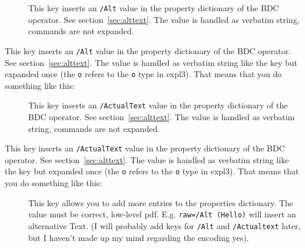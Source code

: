 \documentclass[DIV=12,parskip=half-,bibliography=totoc]{scrartcl}
\begin{document}
\begin{description}
  \item[] This key inserts an \texttt{/Alt} value in the property dictionary of the BDC operator. See section~\ref{sec:alttext}. The value is handled as verbatim string, commands are not expanded.

  \item[ This key inserts an \texttt{/Alt} value in the property dictionary of the BDC operator. See section~\ref{sec:alttext}. The value is handled as verbatim string like the key  but expanded once (the \texttt{o} refers to the \texttt{o} type in expl3). That means that you do something like this:

      \begin{lstlisting}
      \newcommand\myalttext{\frac{a}{b}}
      \tagmcbegin{tag=P,alttext-o=\myalttext}
      \end{lstlisting}

      and it will insert \verb+\frac{a}{b}+  (hex encoded) in the pdf.

  \item[\PrintKeyName{actualtext}] This key inserts an \texttt{/ActualText} value in the property dictionary of the BDC operator. See section~\ref{sec:alttext}. The value is handled as verbatim string, commands are not expanded.

  \item[ This key inserts an \texttt{/ActualText} value in the property dictionary of the BDC operator. See section~\ref{sec:alttext}. The value is handled as verbatim string like the key  but expanded once (the \texttt{o} refers to the \texttt{o} type in expl3). That means that you do something like this:

      \begin{lstlisting}
      \newcommand\myactualtext{X}
      \tagmcbegin{tag=P,alttext-o=\myactualtext}
      \end{lstlisting}

      and it will insert \verb+X+ (hex encoded)  in the pdf.

  \item[\PrintKeyName{raw}] This key allows you to add more entries to the properties dictionary. The value must be correct, low-level pdf. E.g. \verb+raw=/Alt (Hello)+ will insert an alternative Text. (I will probably add keys for \texttt{/Alt} and \texttt{/Actualtext} later, but I haven't made up my mind regarding the encoding yes).
\end{description}
\end{document}
